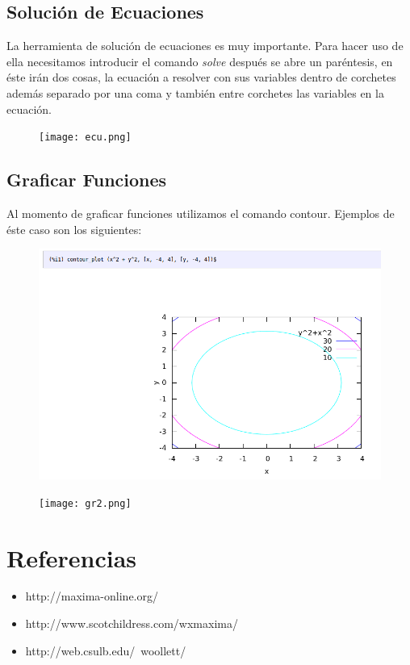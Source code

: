 \documentclass{article}
\begin{document}
\subsection{Solución de Ecuaciones}
La herramienta de solución de ecuaciones es muy importante. Para hacer uso de ella necesitamos introducir el comando \textit{solve} después se abre un paréntesis, en éste irán dos cosas, la ecuación a resolver con sus variables dentro de corchetes además separado por una coma y también entre corchetes las variables en la ecuación.

	\begin{figure}[H]
		\centering
        \texttt{[image: ecu.png]}
	\end{figure}
    
\subsection{Graficar Funciones}
Al momento de graficar funciones utilizamos el comando contour. Ejemplos de éste caso son los siguientes:

	\begin{figure}[H]
		\centering
        \includegraphics[width=\linewidth]{grax.png}
	\end{figure}
    
    \begin{figure}[H]
    	\centering
        \texttt{[image: gr2.png]}
    \end{figure}
    
\section{Referencias}

	\begin{itemize}
		\item \textnormal{http://maxima-online.org/}
    	\item \textnormal{http://www.scotchildress.com/wxmaxima/}
        \item \textnormal{http://web.csulb.edu/~woollett/}
	\end{itemize}
\end{document}
